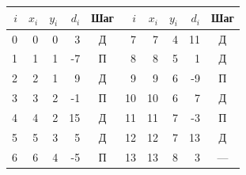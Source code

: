 \begin{tabular}{rrrrc@{\qquad}rrrrc}\toprule
$i$ & $x_i$ & $y_i$ & $d_i$ & Шаг & $i$ & $x_i$ & $y_i$ & $d_i$ & Шаг\\\midrule
0 & 0 & 0 & 3 & Д & 7 & 7 & 4 & 11 & Д\\
1 & 1 & 1 & -7 & П & 8 & 8 & 5 & 1 & Д\\
2 & 2 & 1 & 9 & Д & 9 & 9 & 6 & -9 & П\\
3 & 3 & 2 & -1 & П & 10 & 10 & 6 & 7 & Д\\
4 & 4 & 2 & 15 & Д & 11 & 11 & 7 & -3 & П\\
5 & 5 & 3 & 5 & Д & 12 & 12 & 7 & 13 & Д\\
6 & 6 & 4 & -5 & П & 13 & 13 & 8 & 3 & ---\\
\bottomrule\end{tabular}
